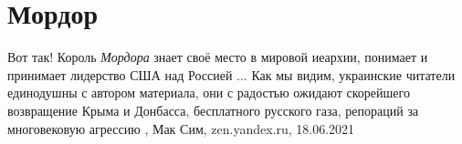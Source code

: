  
 
 
 
 
\chapter{Мордор}
\label{sec:slova.mordor}

Вот так! Король \emph{Мордора} знает своё место в мировой иеархии, понимает и
принимает лидерство США над Россией ... Как мы видим, украинские читатели
единодушны с автором материала, они с радостью ожидают скорейшего возвращение
Крыма и Донбасса, бесплатного русского газа, репораций за многовековую агрессию
, 
Мак Сим, zen.yandex.ru, 18.06.2021

